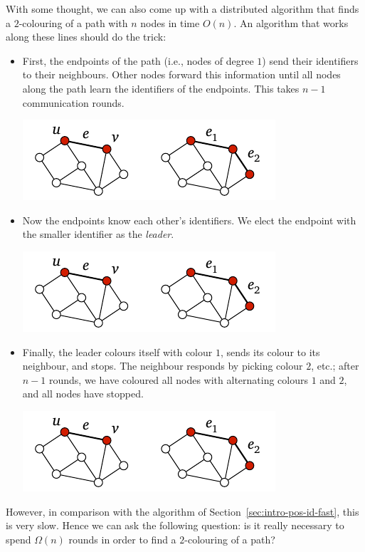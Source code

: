 With some thought, we can also come up with a distributed algorithm that finds a $2$-colouring of a path with $n$ nodes in time $O(n)$. An algorithm that works along these lines should do the trick:
\begin{itemize}
    \item First, the endpoints of the path (i.e., nodes of degree $1$) send their identifiers to their neighbours. Other nodes forward this information until all nodes along the path learn the identifiers of the endpoints. This takes $n-1$ communication rounds.
    \begin{center}
        \includegraphics[page=\PIntroTwoColA]{figs.pdf}
    \end{center}
    \item Now the endpoints know each other's identifiers. We elect the endpoint with the smaller identifier as the \emph{leader}.
    \begin{center}
        \includegraphics[page=\PIntroTwoColB]{figs.pdf}
    \end{center}
    \item Finally, the leader colours itself with colour $1$, sends its colour to its neighbour, and stops. The neighbour responds by picking colour $2$, etc.; after $n-1$ rounds, we have coloured all nodes with alternating colours $1$ and $2$, and all nodes have stopped.
    \begin{center}
        \includegraphics[page=\PIntroColTwo]{figs.pdf}
    \end{center}
\end{itemize}
However, in comparison with the algorithm of Section~\ref{sec:intro-pos-id-fast}, this is very slow. Hence we can ask the following question: is it really necessary to spend $\Omega(n)$ rounds in order to find a $2$-colouring of a path?


